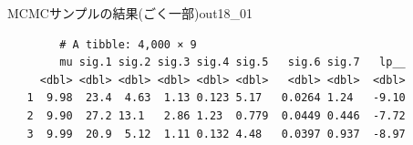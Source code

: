 \begin{Rscreen}{MCMCサンプルの結果(ごく一部)}{out18_01}
	\begin{verbatim}
        # A tibble: 4,000 × 9
        mu sig.1 sig.2 sig.3 sig.4 sig.5   sig.6 sig.7   lp__
     <dbl> <dbl> <dbl> <dbl> <dbl> <dbl>   <dbl> <dbl>  <dbl>
   1  9.98  23.4  4.63  1.13 0.123 5.17   0.0264 1.24   -9.10
   2  9.90  27.2 13.1   2.86 1.23  0.779  0.0449 0.446  -7.72
   3  9.99  20.9  5.12  1.11 0.132 4.48   0.0397 0.937  -8.97
\end{verbatim}
\end{Rscreen}
